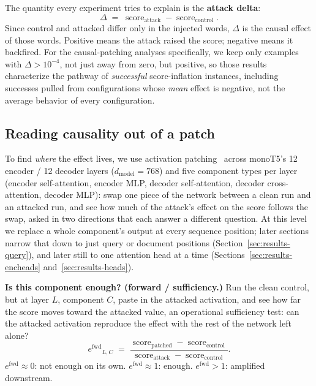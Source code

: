 \documentclass[11pt]{article}
\newcommand{\fwd}{\ensuremath{e^{\mathrm{fwd}}}}
\newcommand{\score}{\operatorname{score}}
\begin{document}
The quantity every experiment tries to explain is the \textbf{attack delta}:
\begin{equation}
\Delta \;=\; \score_{\text{attack}} - \score_{\text{control}}.
\label{eq:delta}
\end{equation}
Since control and attacked differ only in the injected words, $\Delta$ is the
causal effect of those words. Positive means the attack raised the score;
negative means it backfired. For the causal-patching analyses
specifically, we keep only examples with $\Delta>10^{-4}$, not just away
from zero, but positive, so those results characterize the pathway of
\emph{successful} score-inflation instances, including successes pulled
from configurations whose \emph{mean} effect is negative, not the average
behavior of every configuration.

\subsection{Reading causality out of a patch}
\label{sec:method-patching}

To find \emph{where} the effect lives, we use activation
patching~\citep{meng2022locating} across
monoT5's 12 encoder / 12 decoder layers ($d_{\text{model}}=768$) and five
component types per layer (encoder self-attention, encoder MLP, decoder
self-attention, decoder cross-attention, decoder MLP): swap one piece of
the network between a clean run and an attacked run, and see how much of
the attack's effect on the score follows the swap, asked in two
directions that each answer a different question. At this level we
replace a whole component's output at every sequence position; later
sections narrow that down to just query or document positions
(Section~\ref{sec:results-query}), and later still to one attention head
at a time (Sections~\ref{sec:results-encheads}
and~\ref{sec:results-heads}).

\textbf{Is this component enough? (forward / sufficiency.)} Run the clean
control, but at layer $L$, component $C$, paste in the attacked activation, and
see how far the score moves toward the attacked value, an operational
sufficiency test: can the attacked activation reproduce the effect with
the rest of the network left alone?
\begin{equation}
\fwd_{L,C} \;=\;
\frac{\score_{\text{patched}} - \score_{\text{control}}}
     {\score_{\text{attack}} - \score_{\text{control}}}.
\label{eq:fwd}
\end{equation}
$\fwd\approx0$: not enough on its own. $\fwd\approx1$: enough. $\fwd>1$:
amplified downstream.
\end{document}
